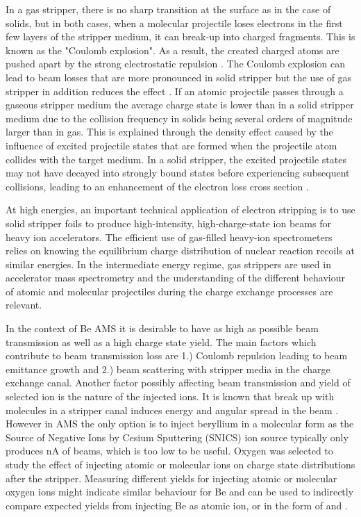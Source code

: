 \documentclass[a4paper,fleqn,review]{cas-sc}
\begin{document}
In a gas stripper, there is no sharp transition at the surface as in the case of solids, but in both cases, when a molecular projectile loses electrons in the first few layers of the stripper medium, it can break-up into charged fragments. This is known as the "Coulomb explosion". As a result, the created charged atoms are pushed apart by the  strong electrostatic repulsion \cite{maor1985charge}. The Coulomb explosion can lead to beam losses  that are more pronounced in solid stripper but the use of gas stripper in addition reduces the effect \cite{suter2022impact}.  If an atomic projectile passes through a gaseous stripper medium the average charge state is lower than in a solid stripper medium due to the collision frequency in solids being several orders of magnitude larger than in gas. This is explained through the density effect \cite{okuno2011low} caused by the influence of excited projectile states that are formed when the projectile atom collides with the target medium. In a solid stripper, the excited projectile states may not have decayed into strongly bound states before experiencing subsequent collisions, leading to an enhancement of the electron loss cross section \cite{betz1971review}.

At high energies, an important technical application of electron stripping is to  use solid stripper foils to produce high-intensity, high-charge-state ion beams for heavy ion accelerators. The efficient use of gas-filled heavy-ion spectrometers relies on knowing the equilibrium charge distribution of nuclear reaction recoils at similar energies. In the intermediate energy regime, gas strippers are used in accelerator mass spectrometry and the understanding of the different behaviour of atomic and molecular projectiles during the charge exchange processes are relevant.
 
In the context of Be AMS it is desirable to have as high as possible beam transmission as well as a high charge state yield. The main factors which contribute to beam transmission loss are 1.) Coulomb repulsion leading to beam emittance growth and 2.) beam scattering with stripper media in the charge exchange canal. %
Another factor  possibly affecting beam transmission and yield of selected ion is the nature of the injected ions. It is known that break up with molecules in a stripper canal induces energy and angular spread in the beam \cite{suter2022impact}. However in  AMS the only option is to inject beryllium in a molecular form as the Source of Negative Ions by Cesium Sputtering (SNICS) ion source typically only produces nA of  beams, which is too low to be useful. 
Oxygen was selected to study the effect of injecting atomic or molecular ions on charge state distributions after the stripper. 
Measuring different yields for injecting atomic or molecular oxygen ions might indicate similar behaviour for Be and can be used to indirectly compare expected yields from injecting Be as atomic ion, or in the form of  and  .
   
\end{document}
